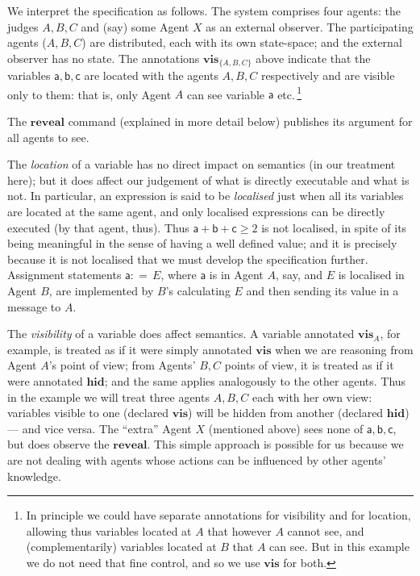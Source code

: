 \documentclass[runningheads]{llncs}
\newcommand\Va {\mathsf{a}}
\newcommand\Vb {\mathsf{b}}
\newcommand\Vc {\mathsf{c}}
\newcommand\Gets {{:}{=}\,}
\newcommand\Reveal {\textbf{reveal}}
\newcommand\Vis {\textbf{vis}}
\newcommand\Hid {\textbf{hid}}
\begin{document}
We interpret the specification as follows. The system comprises four agents: the judges $A,B,C$ and (say) some Agent $X$ as an external observer. The participating agents ($A,B,C$) are distributed, each with its own state-space; and the external observer has no state. The annotations $\Vis_{\{A,B,C\}}$ above indicate that the variables $\Va,\Vb,\Vc$ are located with the agents $A,B,C$ respectively and are visible only to them: that is, only Agent $A$ can see variable $\Va$ etc.\,\footnote{In principle we could have separate annotations for visibility and for location, allowing thus variables located at $A$ that however $A$ cannot see, and (complementarily) variables located at $B$ that $A$ can see. But in this example we do not need that fine control, and so we use $\Vis$ for both.}

The $\Reveal$ command (explained in more detail below) publishes its argument for all agents to see.

The \emph{location} of a variable has no direct impact on semantics (in our treatment here); but it does affect our judgement of what is directly executable and what is not. In particular, an expression is said to be \emph{localised} just when all its variables are located at the same agent, and only localised expressions can be directly executed (by that agent, thus). Thus $\Va{+}\Vb{+}\Vc \geq 2$ is not localised, in spite of its being meaningful in the sense of having a well defined value; and it is precisely because it is not localised that we must develop the specification further. Assignment statements $\Va\Gets E$, where $\Va$ is in Agent $A$, say, and $E$ is localised in Agent $B$, are implemented by $B$'s calculating $E$ and then sending its value in a message to $A$.

The \emph{visibility} of a variable does affect semantics. A variable annotated $\Vis_{A}$, for example, is treated as if it were simply annotated $\Vis$ when we are reasoning from Agent $A$'s point of view; from Agents' $B,C$ points of view, it is treated as if it were annotated $\Hid$; and the same applies analogously to the other agents. Thus in the example we will treat three agents $A,B,C$ each with her own view: variables visible to one (declared $\Vis$) will be hidden from another (declared $\Hid$) --- and vice versa. The ``extra'' Agent $X$ (mentioned above) sees none of $\Va,\Vb,\Vc$, but does observe the $\Reveal$. This simple approach is possible for us because we are not dealing with agents whose actions can be influenced by other agents' knowledge.
\end{document}
